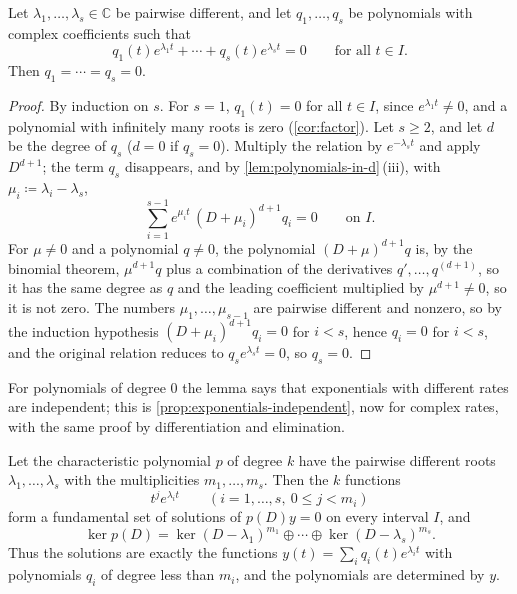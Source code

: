 \begin{lemma}
\label{lem:exp-polynomials}
Let $\lambda_1,\ldots,\lambda_s\in\mathbb C$ be pairwise different, and let $q_1,\ldots,q_s$ be polynomials with complex coefficients such that
\[
q_1(t)e^{\lambda_1t}+\cdots+q_s(t)e^{\lambda_st}=0\qquad\text{for all }t\in I .
\]
Then $q_1=\cdots=q_s=0$.
\end{lemma}

\begin{proof}
By induction on $s$. For $s=1$, $q_1(t)=0$ for all $t\in I$, since $e^{\lambda_1t}\ne0$, and a polynomial with infinitely many roots is zero (\cref{cor:factor}). Let $s\ge2$, and let $d$ be the degree of $q_s$ ($d=0$ if $q_s=0$). Multiply the relation by $e^{-\lambda_st}$ and apply $D^{d+1}$; the term $q_s$ disappears, and by \cref{lem:polynomials-in-d}\,(iii), with $\mu_i\coloneqq\lambda_i-\lambda_s$,
\[
\sum_{i=1}^{s-1}e^{\mu_it}\,(D+\mu_i)^{d+1}q_i=0\qquad\text{on }I .
\]
For $\mu\ne0$ and a polynomial $q\ne0$, the polynomial $(D+\mu)^{d+1}q$ is, by the binomial theorem, $\mu^{d+1}q$ plus a combination of the derivatives $q',\ldots,q^{(d+1)}$, so it has the same degree as $q$ and the leading coefficient multiplied by $\mu^{d+1}\ne0$, so it is not zero. The numbers $\mu_1,\ldots,\mu_{s-1}$ are pairwise different and nonzero, so by the induction hypothesis $(D+\mu_i)^{d+1}q_i=0$ for $i<s$, hence $q_i=0$ for $i<s$, and the original relation reduces to $q_se^{\lambda_st}=0$, so $q_s=0$.
\end{proof}

For polynomials of degree $0$ the lemma says that exponentials with different rates are independent; this is \cref{prop:exponentials-independent}, now for complex rates, with the same proof by differentiation and elimination.

\begin{theorem}
\label{thm:constant-coefficients}
Let the characteristic polynomial $p$ of degree $k$ have the pairwise different roots $\lambda_1,\ldots,\lambda_s$ with the multiplicities $m_1,\ldots,m_s$. Then the $k$ functions
\[
t^je^{\lambda_it}\qquad(i=1,\ldots,s,\ 0\le j<m_i)
\]
form a fundamental set of solutions of $p(D)y=0$ on every interval $I$, and
\[
\ker p(D)=\ker(D-\lambda_1)^{m_1}\oplus\cdots\oplus\ker(D-\lambda_s)^{m_s} .
\]
Thus the solutions are exactly the functions $y(t)=\sum_iq_i(t)e^{\lambda_it}$ with polynomials $q_i$ of degree less than $m_i$, and the polynomials are determined by $y$.
\end{theorem}

